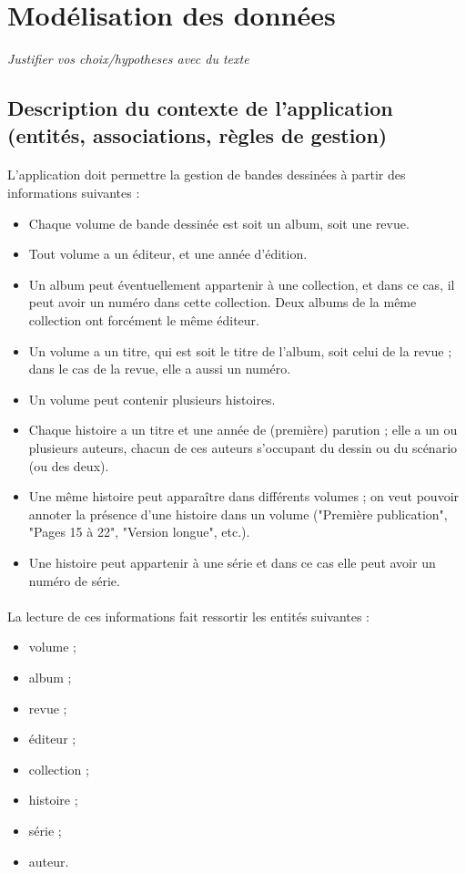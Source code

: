 \documentclass[12pt]{report}
\begin{document}
\section{Modélisation des données}

\emph{Justifier vos choix/hypotheses avec du texte}

\subsection{Description du contexte de l'application (entités, associations, règles de gestion)}

\paragraph{}
L'application doit permettre la gestion de bandes dessinées à partir des
informations suivantes :

\begin{itemize}
	\item Chaque volume de bande dessinée est soit un album, soit une revue.
	\item Tout volume a un éditeur, et une année d’édition.
	\item Un album peut éventuellement appartenir à une collection, et dans ce cas, il
		peut avoir un numéro dans cette collection. Deux albums de la même collection
		ont forcément le même éditeur.
	\item Un volume a un titre, qui est soit le titre de l'album, soit celui de la
		revue ; dans le cas de la revue, elle a aussi un numéro.
	\item Un volume peut contenir plusieurs histoires.
	\item Chaque histoire a un titre et une année de (première) parution ; elle a un
		ou plusieurs auteurs, chacun de ces auteurs s’occupant du dessin ou du
		scénario (ou des deux).
	\item Une même histoire peut apparaître dans différents volumes ; on veut pouvoir
		annoter la présence d’une histoire dans un volume ("Première publication",
		"Pages 15 à 22", "Version longue", etc.).
	\item Une histoire peut appartenir à une série et dans ce cas elle peut avoir un
		numéro de série.
\end{itemize}

\paragraph{}
La lecture de ces informations fait ressortir les entités suivantes :
\begin{itemize}
	\item volume ;
	\item album ;
	\item revue ;
	\item éditeur ;
	\item collection ;
	\item histoire ;
	\item série ;
	\item auteur.
\end{itemize}
\end{document}
